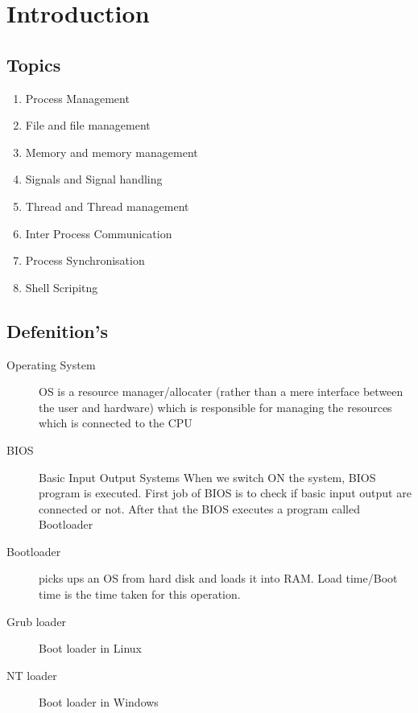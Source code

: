 \documentclass[11pt,fleqn]{book} %
\begin{document}


\chapter{Introduction}

\section{Topics}

\begin{enumerate}
	\item Process Management
	\item File and file management
	\item Memory and memory management
	\item Signals and Signal handling
	\item Thread and Thread management
	\item Inter Process Communication
	\item Process Synchronisation
	\item Shell Scripitng
\end{enumerate}

\section{Defenition's}

\begin{description}
\item[Operating System] OS is a resource manager/allocater (rather than a mere interface between the user and hardware) which is responsible for managing the resources which is connected to the CPU

\item[BIOS] Basic Input Output Systems
When we switch ON the system, BIOS program is executed. First job of BIOS is to check if basic input output are connected or not. After that the BIOS executes a program called Bootloader

\item[Bootloader] picks ups an OS from hard disk and loads it into RAM. Load time/Boot time is the time taken for this operation.

\item[Grub loader] Boot loader in Linux
\item[NT loader] Boot loader in Windows
\end{description}
\end{document}
